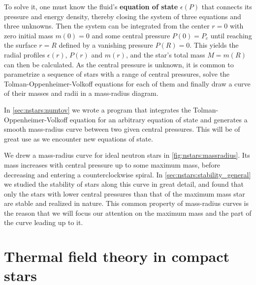 To solve it, one must know the fluid's \textbf{equation of state} $\epsilon(P)$ that connects its pressure and energy density, thereby closing the system of three equations and three unknowns.
Then the system can be integrated from the center $r=0$ with zero initial mass $m(0) = 0$ and some central pressure $P(0) = P_c$ until reaching the surface $r=R$ defined by a vanishing pressure $P(R) = 0$.
This yields the radial profiles $\epsilon(r)$, $P(r)$ and $m(r)$, and the star's total mass $M = m(R)$ can then be calculated.
As the central pressure is unknown, it is common to parametrize a sequence of stars with a range of central pressures, solve the Tolman-Oppenheimer-Volkoff equations for each of them and finally draw a curve of their masses and radii in a mass-radius diagram.

In \cref{sec:nstars:numtov} we wrote a program that integrates the Tolman-Oppenheimer-Volkoff equation for an arbitrary equation of state and generates a smooth mass-radius curve between two given central pressures.
This will be of great use as we encounter new equations of state.

We drew a mass-radius curve for ideal neutron stars in \cref{fig:nstars:massradius}.
Its mass increases with central pressure up to some maximum mass, before decreasing and entering a counterclockwise spiral.
In \cref{sec:nstars:stability_general} we studied the stability of stars along this curve in great detail,
and found that only the stars with lower central pressures than that of the maximum mass star are stable and realized in nature.
This common property of mass-radius curves is the reason that we will focus our attention on the maximum mass and the part of the curve leading up to it.

\section{Thermal field theory in compact stars}
\label{sec:master_intro:tft}

